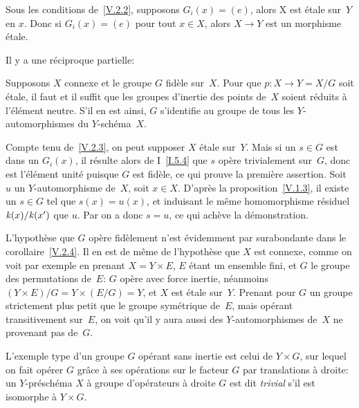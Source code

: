 \begin{corollaire}
\label{V.2.3}
Sous
les conditions de~\ref{V.2.2}, supposons $G_i(x)=(e)$, alors X
est \'etale sur~$Y$ en $x$. Donc si $G_i(x)=(e)$ pour tout $x \in
X$, alors $X \to Y$ est un morphisme \'etale.
\end{corollaire}

Il y a une r\'eciproque partielle:

\begin{corollaire}
\label{V.2.4} Supposons $X$ connexe et le groupe $G$ fid\`ele
sur~$X$. Pour que $p \colon X \to Y=X/G$ soit \'etale, il faut et il
suffit que les groupes d'inertie des points de~$X$ soient r\'eduits
\`a l'\'el\'ement neutre. S'il en est ainsi, $G$ s'identifie au
groupe de tous les $Y$-automorphismes du $Y$-sch\'ema~$X$.
\end{corollaire}

Compte tenu de~\ref{V.2.3}, on peut supposer $X$ \'etale sur~$Y$. Mais si un $s \in G$ est dans un $G_i(x)$, il r\'esulte alors
de I~\ref{I.5.4} que $s$ op\`ere trivialement sur~$G$, donc est
l'\'el\'ement unit\'e puisque $G$ est fid\`ele, ce qui prouve
la premi\`ere assertion. Soit $u$ un $Y$-automorphisme de~$X$, soit
$x \in X$. D'apr\`es la proposition~\ref{V.1.3}, il existe un $s \in
G$ tel que $s(x)=u(x)$, et induisant le m\^eme homomorphisme
r\'esiduel
$\mathit{k}(x)/\mathit{k}(x')$
que $u$. Par \loccit on a donc
$s=u$, ce qui ach\`eve la d\'emonstration.

\begin{remarque}
\label{V.2.5}
L'hypoth\`ese que $G$ op\`ere fid\`element n'est \'evidemment
par surabondante dans le corollaire~\ref{V.2.4}. Il en est de m\^eme
de l'hypoth\`ese que $X$ est connexe, comme on voit par exemple en
prenant $X=Y \times E$, $E$ \'etant un ensemble fini, et $G$ le
groupe des permutations de~$E$: $G$ op\`ere avec force inertie,
n\'eanmoins $(Y \times E)/G=Y \times (E/G)=Y$, et $X$ est \'etale
sur~$Y$. Prenant pour $G$ un groupe strictement plus petit que le
groupe sym\'etrique de~$E$, mais op\'erant transitivement sur~$E$,
on voit qu'il y aura aussi des $Y$-automorphismes de~$X$ ne provenant
pas de~$G$.
\end{remarque}

L'exemple type d'un groupe $G$ op\'erant sans inertie est celui de
$Y \times G$, sur lequel on fait op\'erer $G$ gr\^ace \`a ses
op\'erations sur le facteur $G$ par translations \`a droite: un
$Y$-pr\'esch\'ema $X$ \`a groupe d'op\'erateurs \`a droite
$G$ est dit \emph{trivial} s'il est isomorphe \`a $Y \times G$.

